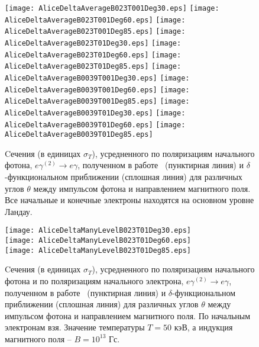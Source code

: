 \begin{figure}[t!]\centering
	\texttt{[image: AliceDeltaAverageB023T001Deg30.eps]}
	\texttt{[image: AliceDeltaAverageB023T001Deg60.eps]}
	\texttt{[image: AliceDeltaAverageB023T001Deg85.eps]}
	\texttt{[image: AliceDeltaAverageB023T01Deg30.eps]}
	\texttt{[image: AliceDeltaAverageB023T01Deg60.eps]}
	\texttt{[image: AliceDeltaAverageB023T01Deg85.eps]}
	\texttt{[image: AliceDeltaAverageB0039T001Deg30.eps]}
	\texttt{[image: AliceDeltaAverageB0039T001Deg60.eps]}
	\texttt{[image: AliceDeltaAverageB0039T001Deg85.eps]}
	\texttt{[image: AliceDeltaAverageB0039T01Deg30.eps]}
	\texttt{[image: AliceDeltaAverageB0039T01Deg60.eps]}
	\texttt{[image: AliceDeltaAverageB0039T01Deg85.eps]}	
	\caption{Cечения (в единицах $\sigma_T$), усредненного по поляризациям начального фотона, $e\gamma^{(2)}  \to e\gamma$, полученном в работе~\cite{Harding:1991} (пунктирная линия) и $\delta$-функциональном приближении (сплошная линия) для различных углов $\theta$ между импульсом фотона и направлением магнитного поля. Все начальные и конечные электроны находятся на основном уровне Ландау.}
	\label{fig:CompAndHardO}
\end{figure}
\clearpage
\begin{figure}[t!]\centering
	\texttt{[image: AliceDeltaManyLevelB023T01Deg30.eps]}\\
	\texttt{[image: AliceDeltaManyLevelB023T01Deg60.eps]}\\
	\texttt{[image: AliceDeltaManyLevelB023T01Deg85.eps]}
	\caption{Cечения (в единицах $\sigma_T$), усредненного по поляризациям начального фотона и по поляризациям начального электрона, $e\gamma^{(2)}  \to e\gamma$, полученном в работе~\cite{Harding:1991} (пунктирная линия) и $\delta$-функциональном приближении (сплошная линия) для различных углов $\theta$ между импульсом фотона и направлением магнитного поля. По начальным электронам взя. Значение температуры $T=50$ кэВ, а индукция магнитного поля -- $B=10^{13}$ Гс.\label{fig:HardingManyLevels}}
\end{figure}
\clearpage
